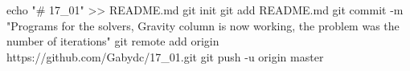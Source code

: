 echo "# 17_01" >> README.md
git init
git add README.md
git commit -m "Programs for the solvers, Gravity column is now working, the problem was the number of iterations"
git remote add origin https://github.com/Gabydc/17_01.git
git push -u origin master

